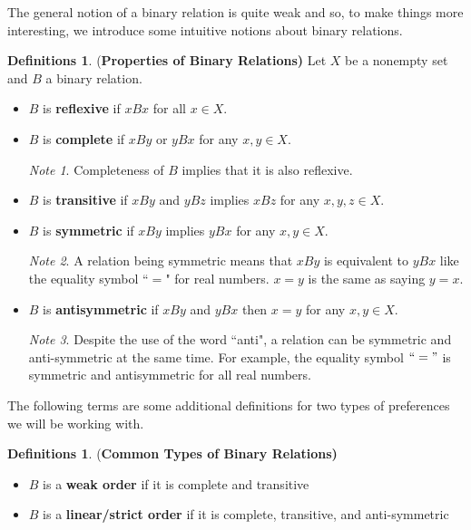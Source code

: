 \documentclass[12pt]{article}
\theoremstyle{plain}
\theoremstyle{definition}
\newtheorem{undefin}[defin]{Definitions}
\theoremstyle{remark}
\newtheorem*{note}{Note}
\newcommand{\tn}[1]{\textnormal{#1}}
\newcommand{\3}{\vspace*{3mm}}
\newcommand{\name}[1]{\tn{(\textbf{#1)}}}
\begin{document}
The general notion of a binary relation is quite weak and so, to make things more interesting, we introduce some intuitive notions about binary relations.

\begin{undefin} \name{Properties of Binary Relations}
Let $X$ be a nonempty set and $B$ a binary relation.
\begin{itemize}
\item $B$ is \textbf{reflexive} if $x B x$ for all $x \in X$. 
\item $B$ is \textbf{complete} if $x B y$ or $y B x $ for any $x, y \in X$.
\begin{note}
Completeness of $B$ implies that it is also reflexive.
\end{note}
\item $B$ is \textbf{transitive} if $x B y$ and $y B z$ implies $x B z$ for any $x,y,z \in X$.
\item $B$ is \textbf{symmetric} if $x B y $ implies $y B x$ for any $x, y \in X$.
\begin{note}
A relation being symmetric means that $x B y$ is equivalent to $ y B x$ like the equality symbol ``$=$" for real numbers. $x = y$ is the same as saying $y = x$.
\end{note}
\item $B$ is \textbf{antisymmetric} if $x B y $ and $y B x$ then $ x = y$ for any $x,y \in X$. 
\begin{note}
Despite the use of the word ``anti", a relation can be symmetric and anti-symmetric at the same time. For example, the equality symbol $``="$ is symmetric and antisymmetric for all real numbers. 

\end{note}
\end{itemize}
\end{undefin}

The following terms are some additional definitions for two types of preferences we will be working with.

\begin{undefin} \name{Common Types of Binary Relations}
\
\begin{itemize}
\item \tn{$B$ is a \textbf{weak order} if it is complete and transitive}
\item \tn{$B$ is a \textbf{linear/strict order} if it is complete, transitive, and anti-symmetric}
\end{itemize}
\end{undefin}
\end{document}
